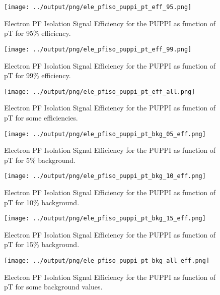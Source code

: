 \documentclass[11pt]{book}
\begin{document}
\begin{figure}[htb]
\centering
\texttt{[image: ../output/png/ele\_pfiso\_puppi\_pt\_eff\_95.png]}
\caption{Electron PF Isolation Signal Efficiency for the PUPPI as function of pT for 95\% efficiency.}
\label{fig:ele_pfiso_pt_eff_puppi_eff_95}
\end{figure}

\begin{figure}[htb]
\centering
\texttt{[image: ../output/png/ele\_pfiso\_puppi\_pt\_eff\_99.png]}
\caption{Electron PF Isolation Signal Efficiency for the PUPPI as function of pT for 99\% efficiency.}
\label{fig:ele_pfiso_pt_eff_puppi_eff_99}
\end{figure}

\begin{figure}[htb]
\centering
\texttt{[image: ../output/png/ele\_pfiso\_puppi\_pt\_eff\_all.png]}
\caption{Electron PF Isolation Signal Efficiency for the PUPPI as function of pT for some efficiencies.}
\label{fig:ele_pfiso_pt_eff_puppi_eff_all}
\end{figure}

\begin{figure}[htb]
\centering
\texttt{[image: ../output/png/ele\_pfiso\_puppi\_pt\_bkg\_05\_eff.png]}
\caption{Electron PF Isolation Signal Efficiency for the PUPPI as function of pT for 5\% background.}
\label{fig:ele_pfiso_pt_bkg_puppi_bkg_05_eff}
\end{figure}

\begin{figure}[htb]
\centering
\texttt{[image: ../output/png/ele\_pfiso\_puppi\_pt\_bkg\_10\_eff.png]}
\caption{Electron PF Isolation Signal Efficiency for the PUPPI as function of pT for 10\% background.}
\label{fig:ele_pfiso_pt_bkg_puppi_bkg_10_eff}
\end{figure}

\begin{figure}[htb]
\centering
\texttt{[image: ../output/png/ele\_pfiso\_puppi\_pt\_bkg\_15\_eff.png]}
\caption{Electron PF Isolation Signal Efficiency for the PUPPI as function of pT for 15\% background.}
\label{fig:ele_pfiso_pt_bkg_puppi_bkg_15_eff}
\end{figure}

\begin{figure}[htb]
\centering
\texttt{[image: ../output/png/ele\_pfiso\_puppi\_pt\_bkg\_all\_eff.png]}
\caption{Electron PF Isolation Signal Efficiency for the PUPPI as function of pT for some background values.}
\label{fig:ele_pfiso_pt_bkg_puppi_bkg_all_eff}
\end{figure}
\clearpage
\end{document}
